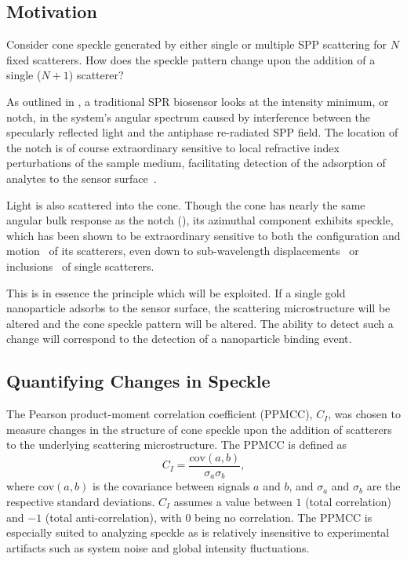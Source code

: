 \subsection{Motivation}
Consider cone speckle generated by either single or multiple SPP scattering
for $N$ fixed scatterers.  How does the speckle pattern change upon the
addition of a single ($N+1$) scatterer?  

As outlined in , a traditional SPR biosensor looks at
the intensity minimum, or notch, in the system's angular spectrum caused by
interference between the specularly reflected light and the antiphase
re-radiated SPP field.  The location of the notch is of course
extraordinary sensitive to local refractive index perturbations of the
sample medium, facilitating detection of the adsorption of analytes to the
sensor surface~\cite{homola1999surface}.  

Light is also scattered into the cone.  Though the cone has nearly the same
angular bulk response as the notch (), its azimuthal
component exhibits speckle, which has been shown to be extraordinary sensitive
to both the configuration and motion~\cite{berkovits1994correlations} of its
scatterers, even down to sub-wavelength
displacements~\cite{berkovits1991sensitivity} or
inclusions~\cite{berkovits1990theory} of single scatterers.

This is in essence the principle which will be exploited.  If a single gold
nanoparticle adsorbs to the sensor surface, the scattering microstructure will
be altered and the cone speckle pattern will be altered.  The ability to
detect such a change will correspond to the detection of a nanoparticle
binding event.

\subsection{Quantifying Changes in Speckle}

The Pearson product-moment correlation coefficient (PPMCC), $C_I$, was chosen
to measure changes in the structure of cone speckle upon the addition of
scatterers to the underlying scattering microstructure.  The PPMCC is defined
as
\begin{equation}
C_I = \frac{\mathrm{cov}(a,b)}{\sigma_a \sigma_b},
\label{eqn:pearsonproductmoment}
\end{equation}
where $\mathrm{cov}(a,b)$ is the covariance between signals $a$ and $b$,
and $\sigma_a$ and $\sigma_b$ are the respective standard deviations.  $C_I$
assumes a value between $1$ (total correlation) and $-1$ (total
anti-correlation), with $0$ being no correlation.  
The PPMCC is especially suited to analyzing speckle as is relatively
insensitive to experimental artifacts such as system noise and global
intensity fluctuations.

